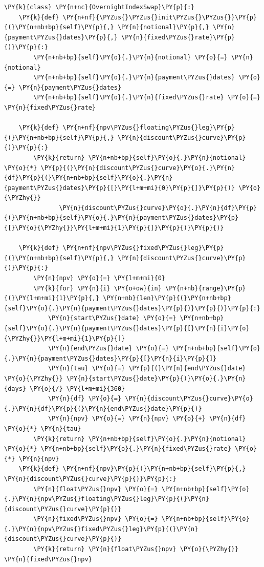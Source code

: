 \begin{codebox}
\begin{Verbatim}[commandchars=\\\{\}]
\PY{k}{class} \PY{n+nc}{OvernightIndexSwap}\PY{p}{:}
    \PY{k}{def} \PY{n+nf}{\PYZus{}\PYZus{}init\PYZus{}\PYZus{}}\PY{p}{(}\PY{n+nb+bp}{self}\PY{p}{,} \PY{n}{notional}\PY{p}{,} \PY{n}{payment\PYZus{}dates}\PY{p}{,} \PY{n}{fixed\PYZus{}rate}\PY{p}{)}\PY{p}{:}
        \PY{n+nb+bp}{self}\PY{o}{.}\PY{n}{notional} \PY{o}{=} \PY{n}{notional}
        \PY{n+nb+bp}{self}\PY{o}{.}\PY{n}{payment\PYZus{}dates} \PY{o}{=} \PY{n}{payment\PYZus{}dates}
        \PY{n+nb+bp}{self}\PY{o}{.}\PY{n}{fixed\PYZus{}rate} \PY{o}{=} \PY{n}{fixed\PYZus{}rate}

    \PY{k}{def} \PY{n+nf}{npv\PYZus{}floating\PYZus{}leg}\PY{p}{(}\PY{n+nb+bp}{self}\PY{p}{,} \PY{n}{discount\PYZus{}curve}\PY{p}{)}\PY{p}{:}
        \PY{k}{return} \PY{n+nb+bp}{self}\PY{o}{.}\PY{n}{notional} \PY{o}{*} \PY{p}{(}\PY{n}{discount\PYZus{}curve}\PY{o}{.}\PY{n}{df}\PY{p}{(}\PY{n+nb+bp}{self}\PY{o}{.}\PY{n}{payment\PYZus{}dates}\PY{p}{[}\PY{l+m+mi}{0}\PY{p}{]}\PY{p}{)} \PY{o}{\PYZhy{}}
               \PY{n}{discount\PYZus{}curve}\PY{o}{.}\PY{n}{df}\PY{p}{(}\PY{n+nb+bp}{self}\PY{o}{.}\PY{n}{payment\PYZus{}dates}\PY{p}{[}\PY{o}{\PYZhy{}}\PY{l+m+mi}{1}\PY{p}{]}\PY{p}{)}\PY{p}{)}

    \PY{k}{def} \PY{n+nf}{npv\PYZus{}fixed\PYZus{}leg}\PY{p}{(}\PY{n+nb+bp}{self}\PY{p}{,} \PY{n}{discount\PYZus{}curve}\PY{p}{)}\PY{p}{:}
        \PY{n}{npv} \PY{o}{=} \PY{l+m+mi}{0}
        \PY{k}{for} \PY{n}{i} \PY{o+ow}{in} \PY{n+nb}{range}\PY{p}{(}\PY{l+m+mi}{1}\PY{p}{,} \PY{n+nb}{len}\PY{p}{(}\PY{n+nb+bp}{self}\PY{o}{.}\PY{n}{payment\PYZus{}dates}\PY{p}{)}\PY{p}{)}\PY{p}{:}
            \PY{n}{start\PYZus{}date} \PY{o}{=} \PY{n+nb+bp}{self}\PY{o}{.}\PY{n}{payment\PYZus{}dates}\PY{p}{[}\PY{n}{i}\PY{o}{\PYZhy{}}\PY{l+m+mi}{1}\PY{p}{]}
            \PY{n}{end\PYZus{}date} \PY{o}{=} \PY{n+nb+bp}{self}\PY{o}{.}\PY{n}{payment\PYZus{}dates}\PY{p}{[}\PY{n}{i}\PY{p}{]}
            \PY{n}{tau} \PY{o}{=} \PY{p}{(}\PY{n}{end\PYZus{}date} \PY{o}{\PYZhy{}} \PY{n}{start\PYZus{}date}\PY{p}{)}\PY{o}{.}\PY{n}{days} \PY{o}{/} \PY{l+m+mi}{360}
            \PY{n}{df} \PY{o}{=} \PY{n}{discount\PYZus{}curve}\PY{o}{.}\PY{n}{df}\PY{p}{(}\PY{n}{end\PYZus{}date}\PY{p}{)}
            \PY{n}{npv} \PY{o}{=} \PY{n}{npv} \PY{o}{+} \PY{n}{df} \PY{o}{*} \PY{n}{tau}
        \PY{k}{return} \PY{n+nb+bp}{self}\PY{o}{.}\PY{n}{notional} \PY{o}{*} \PY{n+nb+bp}{self}\PY{o}{.}\PY{n}{fixed\PYZus{}rate} \PY{o}{*} \PY{n}{npv}
    \PY{k}{def} \PY{n+nf}{npv}\PY{p}{(}\PY{n+nb+bp}{self}\PY{p}{,} \PY{n}{discount\PYZus{}curve}\PY{p}{)}\PY{p}{:}
        \PY{n}{float\PYZus{}npv} \PY{o}{=} \PY{n+nb+bp}{self}\PY{o}{.}\PY{n}{npv\PYZus{}floating\PYZus{}leg}\PY{p}{(}\PY{n}{discount\PYZus{}curve}\PY{p}{)}
        \PY{n}{fixed\PYZus{}npv} \PY{o}{=} \PY{n+nb+bp}{self}\PY{o}{.}\PY{n}{npv\PYZus{}fixed\PYZus{}leg}\PY{p}{(}\PY{n}{discount\PYZus{}curve}\PY{p}{)}
        \PY{k}{return} \PY{n}{float\PYZus{}npv} \PY{o}{\PYZhy{}} \PY{n}{fixed\PYZus{}npv}
\end{Verbatim}
\end{codebox}

